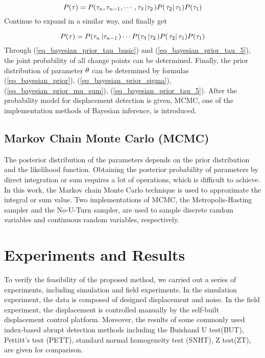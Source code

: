 \documentclass[final,3p,times]{elsarticle}
\begin{document}
	\begin{equation}\label{eq_bayesian_prior_tau_4}
	P({\bf{\tau }}) = P({\tau _n},{\tau _{n - 1}}, \cdots ,{\tau _3}\left| {{\tau _2}} \right.)P(\left. {{\tau _2}} \right|{\tau _1})P({\tau _1})
	\end{equation}
	Continue to expand in a similar way, and finally get
	
	\begin{equation}\label{eq_bayesian_prior_tau_5}
	P({\bf{\tau }}) = P({\tau _n}\left| {{\tau _{n - 1}}} \right.) \cdots P({\tau _3}\left| {{\tau _2}} \right.)P(\left. {{\tau _2}} \right|{\tau _1})P({\tau _1})
	\end{equation}
	Through (\ref{eq_bayesian_prior_tau_basic}) and (\ref{eq_bayesian_prior_tau_5}), the joint probability of all change points can be determined. Finally, the prior distribution of parameter ${\bf{\theta }}$ can be determined by \textcolor{r_s}{formulas} (\ref{eq_bayesian_prior}), (\ref{eq_bayesian_prior_sigma}), (\ref{eq_bayesian_prior_mu_sum}), (\ref{eq_bayesian_prior_tau_5}).  After the \textcolor{r_s}{probability model for} displacement detection is given, MCMC, one of the implementation methods of Bayesian inference, is introduced.
	
	\subsection{Markov Chain Monte Carlo (MCMC)}
	The posterior distribution of the parameters depends on the prior distribution and the likelihood function. Obtaining the posterior probability of parameters by direct integration or sum requires a lot of operations, which is difficult to achieve\cite{robert2013monte}. In this work, the Markov chain Monte Carlo technique is used to approximate the integral or sum value.  Two implementations of MCMC,  the Metropolis-Hasting sampler\cite{chib1995understanding} and the No-U-Turn sampler\cite{hoffman2014no}, are used to sample discrete random variables and continuous random variables, respectively. 
	\section{Experiments and Results}
	\label{exp}
	To verify the feasibility of the proposed method, we carried out a series of experiments, including simulation and field experiments. 
	In the simulation experiment, the data is composed of designed displacement and noise.
	In the field experiment, the displacement is controlled manually by the self-built displacement control platform.
	Moreover, the results of some commonly used index-based abrupt detection methods including the Buishand U test(BUT), Pettitt’s test (PETT), standard normal homogeneity test (SNHT), Z test(ZT), are given for comparison.
	
\end{document}
